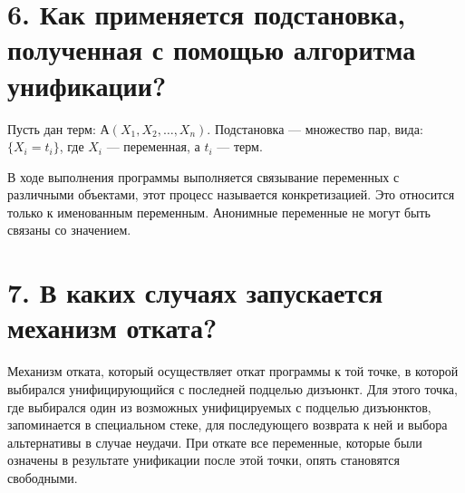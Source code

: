 \section*{6. Как применяется подстановка, полученная с помощью алгоритма унификации?}
Пусть дан терм: $А(X_1, X_2, \ldots , X_n)$.
Подстановка --- множество пар, вида: \\ $\{X _ i = t _ i\}$, где $X_i$ --- переменная, а $t_i$ --- терм.

В ходе выполнения программы выполняется связывание переменных с различными объектами, этот процесс называется конкретизацией. Это относится только к именованным переменным. Анонимные переменные не могут быть связаны со значением.

\section*{7. В каких случаях запускается механизм отката?}
Механизм отката, который осуществляет откат программы к той точке, в которой выбирался унифицирующийся с последней подцелью дизъюнкт.
Для этого точка, где выбирался один из возможных унифицируемых с подцелью дизъюнктов, запоминается в специальном стеке, для последующего возврата к ней и выбора альтернативы в случае неудачи. 
При откате все переменные, которые были означены в результате унификации после этой точки, опять становятся свободными.